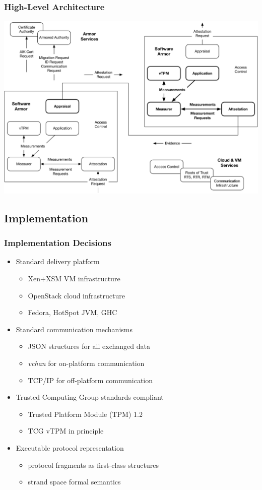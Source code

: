 \documentclass{beamer}
\begin{document}
\begin{frame}
  \frametitle{High-Level Architecture}
  \includegraphics[width=\textwidth]{figures/system.pdf}
\end{frame}

\subsection{Implementation}

\begin{frame}
  \frametitle{Implementation Decisions}

  \begin{itemize}
  \item Standard delivery platform
    \begin{itemize}
    \item Xen+XSM VM infrastructure
    \item OpenStack cloud infrastructure
    \item Fedora, HotSpot JVM, GHC
    \end{itemize}
  \item Standard communication mechanisms
    \begin{itemize}
    \item JSON structures for all exchanged data
    \item \textsl{vchan} for on-platform communication
    \item TCP/IP for off-platform communication
    \end{itemize}
  \item Trusted Computing Group standards compliant
    \begin{itemize}
    \item Trusted Platform Module (TPM) 1.2
    \item TCG vTPM in principle
    \end{itemize}
  \item Executable protocol representation
    \begin{itemize}
    \item protocol fragments as first-class structures
    \item strand space formal semantics
    \end{itemize}
  \end{itemize}
\end{frame}
\end{document}

